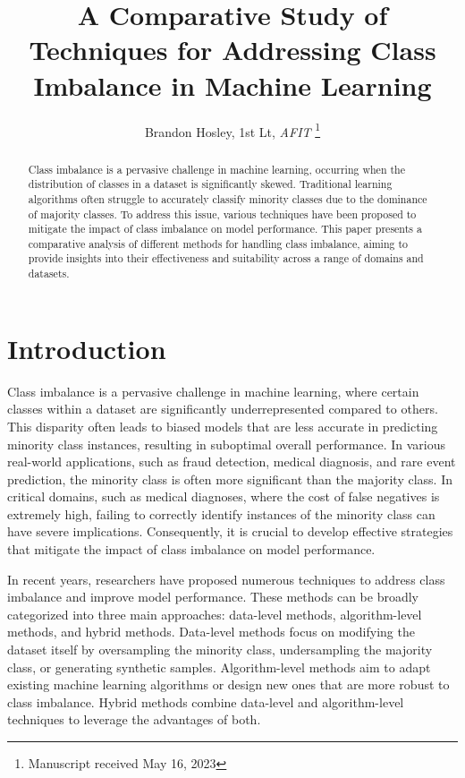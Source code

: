 \documentclass[journal]{IEEEtran}
\title{A Comparative Study of Techniques for Addressing Class Imbalance in Machine Learning}
\author{Brandon Hosley, 1st Lt, \textit{AFIT}%
	\thanks{Manuscript received May 16, 2023%
}}
\begin{document}
	
	\maketitle
	
	
	\begin{abstract}
		Class imbalance is a pervasive challenge in machine learning, occurring when the distribution of classes in a dataset is significantly skewed. Traditional learning algorithms often struggle to accurately classify minority classes due to the dominance of majority classes. To address this issue, various techniques have been proposed to mitigate the impact of class imbalance on model performance. This paper presents a comparative analysis of different methods for handling class imbalance, aiming to provide insights into their effectiveness and suitability across a range of domains and datasets.
	\end{abstract}
	
	\section{Introduction}
	\label{sec:introduction}
	Class imbalance is a pervasive challenge in machine learning, where certain classes within a dataset are significantly underrepresented compared to others. This disparity often leads to biased models that are less accurate in predicting minority class instances, resulting in suboptimal overall performance. In various real-world applications, such as fraud detection, medical diagnosis, and rare event prediction, the minority class is often more significant than the majority class. In critical domains, such as medical diagnoses, where the cost of false negatives is extremely high, failing to correctly identify instances of the minority class can have severe implications. Consequently, it is crucial to develop effective strategies that mitigate the impact of class imbalance on model performance.
	
	In recent years, researchers have proposed numerous techniques to address class imbalance and improve model performance. These methods can be broadly categorized into three main approaches: data-level methods, algorithm-level methods, and hybrid methods. Data-level methods focus on modifying the dataset itself by oversampling the minority class, undersampling the majority class, or generating synthetic samples. Algorithm-level methods aim to adapt existing machine learning algorithms or design new ones that are more robust to class imbalance. Hybrid methods combine data-level and algorithm-level techniques to leverage the advantages of both.
	
\end{document}
